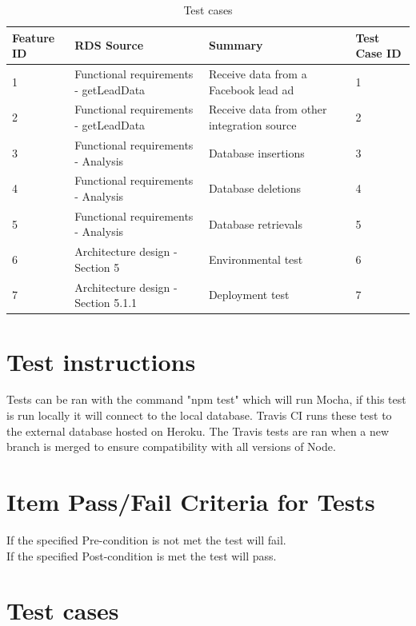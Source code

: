 \documentclass{article}
\begin{document}
\begin{table}[]
\centering
\caption{Test cases}
\label{test_table}
\begin{tabular}{|l|l|l|l|}
\hline
Feature ID & RDS Source                            & Summary                                    & Test Case ID \\ \hline \hline
1          & Functional requirements - getLeadData & Receive data from a Facebook lead ad       & 1            \\ \hline
2          & Functional requirements - getLeadData    & Receive data from other integration source & 2            \\ \hline
3          & Functional requirements - Analysis    & Database insertions                        & 3            \\ \hline
4          & Functional requirements - Analysis    & Database deletions                         & 4            \\ \hline
5          & Functional requirements - Analysis    & Database retrievals                        & 5            \\ \hline
6          &  Architecture design - Section 5      & Environmental test                         & 6            \\ \hline
7          &  Architecture design - Section 5.1.1  & Deployment test                            & 7            \\ \hline
\end{tabular}
\end{table}


\section{Test instructions} 
Tests can be ran with the command "npm test" which will run Mocha, if this test is run locally it will connect to the local database.
Travis CI runs these test to the external database hosted on Heroku. The Travis tests are ran when a new branch is merged to ensure compatibility with all versions of Node.
\section{Item Pass/Fail Criteria for Tests}
If the specified Pre-condition is not met the test will fail. \\
If the specified Post-condition is met the test will pass.
\cleardoublepage
\section{Test cases}
\end{document}

